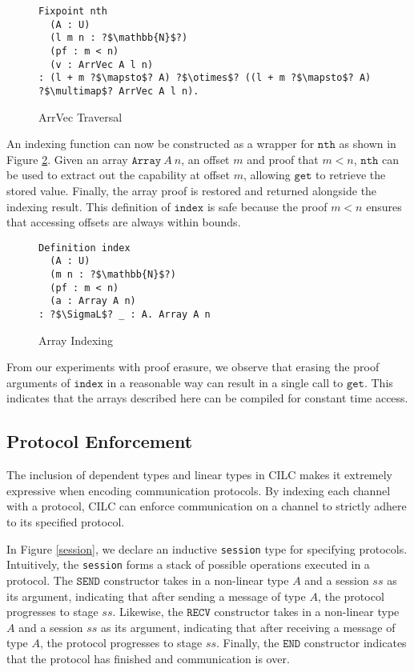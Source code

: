 \documentclass[sigplan,screen,review,anonymous]{acmart}
\newcommand{\get}{\texttt{get}}
\newcommand{\SEND}{\texttt{SEND}}
\newcommand{\RECV}{\texttt{RECV}}
\newcommand{\END}{\texttt{END}}
\newcommand{\SigmaL}{\Sigma_{\scriptscriptstyle L}}
\begin{document}
\begin{figure}[H]
  \caption{ArrVec Traversal}
  \begin{verbatim}
Fixpoint nth 
  (A : U) 
  (l m n : ?$\mathbb{N}$?) 
  (pf : m < n) 
  (v : ArrVec A l n) 
: (l + m ?$\mapsto$? A) ?$\otimes$? ((l + m ?$\mapsto$? A) ?$\multimap$? ArrVec A l n).
  \end{verbatim}
  \label{trav}
  \Description{}
\end{figure}

An indexing function can now be constructed as a wrapper for $\texttt{nth}$ as shown in Figure \ref{index}. Given an array $\texttt{Array}\ A\ n$, an offset $m$ and proof that $m < n$, $\texttt{nth}$ can be used to extract out the capability at offset $m$, allowing $\get$ to retrieve the stored value. Finally, the array proof is restored and returned alongside the indexing result. This definition of $\texttt{index}$ is safe because the proof $m < n$ ensures that accessing offsets are always within bounds.

\begin{figure}[h]
  \caption{Array Indexing}
  \begin{verbatim}
Definition index
  (A : U)
  (m n : ?$\mathbb{N}$?)
  (pf : m < n)
  (a : Array A n) 
: ?$\SigmaL$? _ : A. Array A n
  \end{verbatim}
  \label{index}
  \Description{}
\end{figure}

From our experiments with proof erasure, we observe that erasing the proof arguments of $\texttt{index}$ in a reasonable way can result in a single call to $\get$. This indicates that the arrays described here can be compiled for constant time access.

\subsection{Protocol Enforcement}
The inclusion of dependent types and linear types in CILC makes it extremely expressive when encoding communication protocols. By indexing each channel with a protocol, CILC can enforce communication on a channel to strictly adhere to its specified protocol.

In Figure \ref{session}, we declare an inductive \texttt{session} type for specifying protocols. Intuitively, the \texttt{session}  forms a stack of possible operations executed in a protocol. The $\SEND$ constructor takes in a non-linear type $A$ and a session $ss$ as its argument, indicating that after sending a message of type $A$, the protocol progresses to stage $ss$. Likewise, the $\RECV$ constructor takes in a non-linear type $A$ and a session $ss$ as its argument, indicating that after receiving a message of type $A$, the protocol progresses to stage $ss$. Finally, the $\END$ constructor indicates that the protocol has finished and communication is over.
\end{document}
